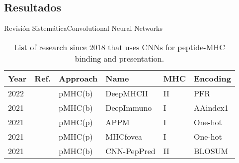 \documentclass[10pt]{beamer}
\newcommand{\1}{
	\setbeamertemplate{background}{
		\texttt{[image: img/1]}
		\tikz[overlay] \fill[fill opacity=0.75,fill=white] (0,0) rectangle (-\paperwidth,\paperheight);
	}
}
\begin{document}
\subsection{Resultados}
\begin{frame}{Revisión Sistemática}{Convolutional Neural Networks}
	
	\fontsize{8pt}{5pt}\selectfont
	
	\begin{table}[]
		\centering
		\caption{List of research since 2018 that uses CNNs for peptide-MHC binding and presentation.}
		\setlength{\tabcolsep}{0.5em} %
		{\renewcommand{\arraystretch}{2}%
			\begin{tabular}{p{0.6cm}p{0.6cm}p{1.5cm}p{2cm}p{0.6cm}p{2.7cm}}
				\textbf{Year} & \textbf{Ref.}                              & \textbf{Approach}        & \textbf{Name} & \textbf{MHC} & \textbf{Encoding}                                                                                                                                                                                   \\ \hline
				
				2022 &	\cite{you2022deepmhcii}	& pMHC(b) &	DeepMHCII &	 II &	PFR \\
				
				2021          & \cite{li2021deepimmuno}   & pMHC(b)      & DeepImmuno    &  I        & AAindex1                                                \\
				2021          & \cite{lang2021neofox}     & pMHC(p) & APPM          &  I        & One-hot                                                                          \\
				2021          & \cite{lee2021connecting}  & pMHC(p) & MHCfovea      &  I        & One-hot                                                                                                      \\
				2021          & \cite{junet2021cnn}       & pMHC(b)      & CNN-PepPred   &  II       & BLOSUM     \\
				

\end{tabular}}
\end{table}
\end{frame}
\end{document}
